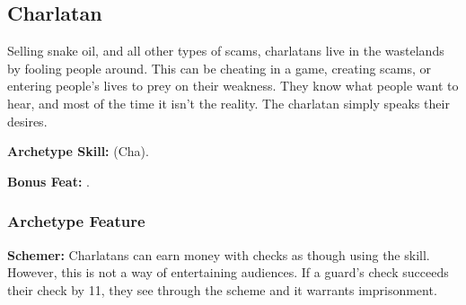\subsection{Charlatan}
Selling snake oil, and all other types of scams, charlatans live in the wastelands by fooling people around. This can be cheating in a game, creating scams, or entering people's lives to prey on their weakness. They know what people want to hear, and most of the time it isn't the reality. The charlatan simply speaks their desires.%

\textbf{Archetype Skill:}  (Cha).

\textbf{Bonus Feat:} .

\subsubsection{Archetype Feature}
\textbf{Schemer:} Charlatans can earn money with  checks as though using the  skill. However, this is not a way of entertaining audiences. If a guard's  check succeeds their  check by 11, they see through the scheme and it warrants imprisonment.
